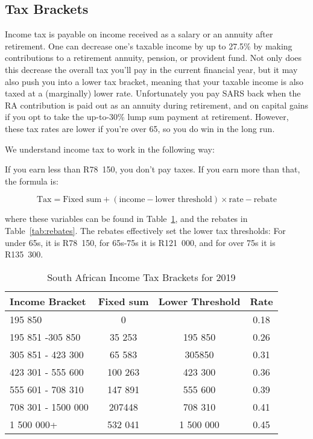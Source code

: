 \documentclass[a4paper, justified]{tufte-handout}
\begin{document}
\subsection{Tax Brackets}
Income tax is payable on income received as a salary or an annuity after retirement. One can decrease one's taxable income by up to 27.5\% by making contributions to a retirement annuity, pension, or provident fund. Not only does this decrease the overall tax you'll pay in the current financial year, but it may also push you into a lower tax bracket, meaning that your taxable income is also taxed at a (marginally) lower rate. Unfortunately you pay SARS back when the RA contribution is paid out as an annuity during retirement, and on capital gains if you opt to take the up-to-30\% lump sum payment at retirement. However, these tax rates are lower if you're over 65, so you do win in the long run.

We understand income tax to work in the following way:

If you earn less than R78~150, you don't pay taxes. If you earn more than that, the formula is:

\begin{equation} \label{equ:IncomeTax}
\textrm{Tax} = \textrm{Fixed sum} + (\textrm{income} - \textrm{lower threshold})\times \textrm{rate} - \textrm{rebate}
\end{equation}

where these variables can be found in Table~\ref{tab:IncomeTax}, and the rebates in Table~\ref{tab:rebates}. The rebates effectively set the lower tax thresholds: For under 65s, it is R78~150, for 65s-75s it is R121~000, and for over 75s it is R135~300.
\begin{table}[b]
	\centering
	\caption{South African Income Tax Brackets for 2019}
	\label{tab:IncomeTax}
	\begin{tabular}{lccc}
		\toprule
		\textbf{Income Bracket}  & \textbf{Fixed sum} & \textbf{Lower Threshold} & \textbf{Rate} \\
		\midrule
		195 850            & 0         &          & 0.18 \\
		195 851 -305 850  & 35 253    & 195 850         & 0.26 \\
		305 851 - 423 300  & 65 583    & 305850          & 0.31  \\
		423 301 - 555 600  & 100 263   & 423 300         & 0.36  \\
		555 601 - 708 310    & 147 891   & 555 600         & 0.39  \\
		708 301 - 1500 000 & 207448    & 708 310         & 0.41 \\
		1 500 000+         & 532 041   & 1 500 000       & 0.45\\
	\bottomrule
	\end{tabular}
\end{table}
\end{document}
